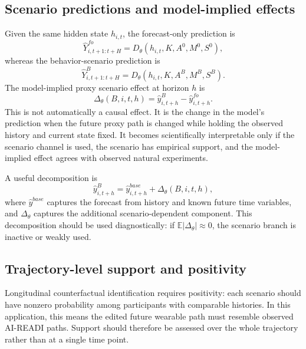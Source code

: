 \subsection{Scenario predictions and model-implied effects}
\label{subsec:scenario_effect}

Given the same hidden state $h_{i,t}$, the forecast-only prediction is
\begin{equation}
    \hat{Y}^{fo}_{i,t+1:t+H}
    = D_\theta(h_{i,t},K,A^0,M^0,S^0),
\end{equation}
whereas the behavior-scenario prediction is
\begin{equation}
    \hat{Y}^{B}_{i,t+1:t+H}
    = D_\theta(h_{i,t},K,A^B,M^B,S^B).
\end{equation}
The model-implied proxy scenario effect at horizon $h$ is
\begin{equation}
    \Delta_\theta(B,i,t,h)
    = \hat{y}^{B}_{i,t+h} - \hat{y}^{fo}_{i,t+h}.
    \label{eq:model_effect}
\end{equation}
This is not automatically a causal effect. It is the change in the model's prediction when the future proxy path is changed while holding the observed history and current state fixed. It becomes scientifically interpretable only if the scenario channel is used, the scenario has empirical support, and the model-implied effect agrees with observed natural experiments.

A useful decomposition is
\begin{equation}
    \hat{y}^{B}_{i,t+h}
    = \hat{y}^{base}_{i,t+h} + \Delta_\theta(B,i,t,h),
    \label{eq:base_delta_decomposition}
\end{equation}
where $\hat{y}^{base}$ captures the forecast from history and known future time variables, and $\Delta_\theta$ captures the additional scenario-dependent component. This decomposition should be used diagnostically: if $\mathbb{E}|\Delta_\theta|\approx 0$, the scenario branch is inactive or weakly used.

\subsection{Trajectory-level support and positivity}
\label{subsec:support_positivity}

Longitudinal counterfactual identification requires positivity: each scenario should have nonzero probability among participants with comparable histories. In this application, this means the edited future wearable path must resemble observed AI-READI paths. Support should therefore be assessed over the whole trajectory rather than at a single time point.

